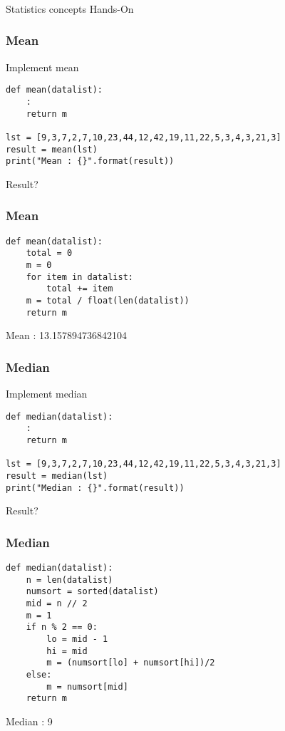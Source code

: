 \begin{frame}[fragile]\frametitle{}
\begin{center}
{\Large Statistics concepts Hands-On}
\end{center}
\end{frame}

\begin{frame}[fragile]\frametitle{Mean}
Implement mean
\begin{lstlisting}
def mean(datalist):
	:
	return m

lst = [9,3,7,2,7,10,23,44,12,42,19,11,22,5,3,4,3,21,3]
result = mean(lst)
print("Mean : {}".format(result))
\end{lstlisting}
Result?
\end{frame}

\begin{frame}[fragile]\frametitle{Mean}
\begin{lstlisting}
def mean(datalist):
	total = 0
	m = 0
	for item in datalist:
		total += item
	m = total / float(len(datalist))
	return m
\end{lstlisting}
Mean : 13.157894736842104
\end{frame}

\begin{frame}[fragile]\frametitle{Median}
Implement median
\begin{lstlisting}
def median(datalist):
	:
	return m

lst = [9,3,7,2,7,10,23,44,12,42,19,11,22,5,3,4,3,21,3]
result = median(lst)
print("Median : {}".format(result))
\end{lstlisting}
Result?
\end{frame}

\begin{frame}[fragile]\frametitle{Median}
\begin{lstlisting}
def median(datalist):
    n = len(datalist)
    numsort = sorted(datalist)
    mid = n // 2
    m = 1
    if n % 2 == 0:
        lo = mid - 1
        hi = mid
        m = (numsort[lo] + numsort[hi])/2
    else:
        m = numsort[mid]
    return m
\end{lstlisting}
Median : 9
\end{frame}


